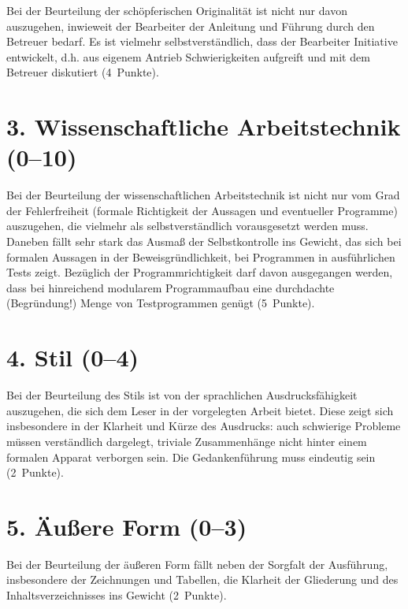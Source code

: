 \documentclass[
    12pt,
    headings=small,
    parskip=half,           %
    bibliography=totoc,
    numbers=noenddot,       %
    open=any,               %
    ]{scrreprt}
\begin{document}
Bei der Beurteilung der schöpferischen Originalität ist nicht nur davon auszugehen, inwieweit der Bearbeiter der Anleitung und Führung durch den Betreuer bedarf. Es ist vielmehr selbstverständlich, dass der Bearbeiter Initiative entwickelt, d.h. aus eigenem Antrieb Schwierigkeiten aufgreift und mit dem Betreuer diskutiert (4~Punkte).

\section*{3. Wissenschaftliche Arbeitstechnik (0--10)}

Bei der Beurteilung der wissenschaftlichen Arbeitstechnik ist nicht nur vom Grad der Fehlerfreiheit (formale Richtigkeit der Aussagen und eventueller Programme) auszugehen, die vielmehr als selbstverständlich vorausgesetzt werden muss. Daneben fällt sehr stark das Ausmaß der Selbstkontrolle ins Gewicht, das sich bei formalen Aussagen in der Beweisgründlichkeit, bei Programmen in ausführlichen Tests zeigt. Bezüglich der Programmrichtigkeit darf davon ausgegangen werden, dass bei hinreichend modularem Programmaufbau eine durchdachte (Begründung!) Menge von Testprogrammen genügt (5~Punkte).

\section*{4. Stil (0--4)}

Bei der Beurteilung des Stils ist von der sprachlichen Ausdrucksfähigkeit auszugehen, die sich dem Leser in der vorgelegten Arbeit bietet. Diese zeigt sich insbesondere in der Klarheit und Kürze des Ausdrucks: auch schwierige Probleme müssen verständlich dargelegt, triviale Zusammenhänge nicht hinter einem formalen Apparat verborgen sein. Die Gedankenführung muss eindeutig sein (2~Punkte).

\section*{5. Äußere Form (0--3)}

Bei der Beurteilung der äußeren Form fällt neben der Sorgfalt der Ausführung, insbesondere der Zeichnungen und Tabellen, die Klarheit der Gliederung und des
Inhaltsverzeichnisses ins Gewicht (2~Punkte).


\end{document}
